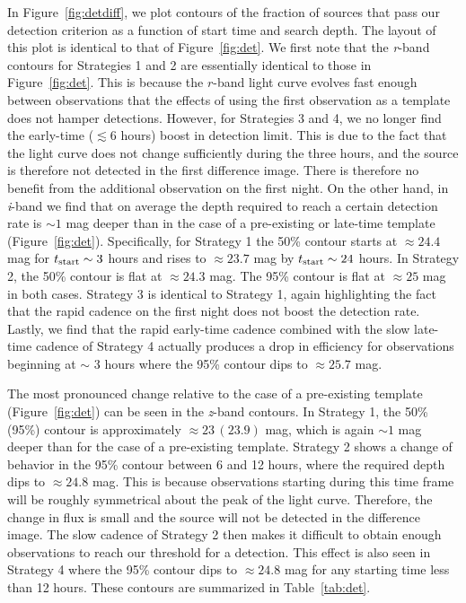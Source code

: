 In Figure~\ref{fig:detdiff}, we plot contours of the fraction of sources that pass our detection criterion as a function of start time and search depth. The layout of this plot is identical to that of Figure~\ref{fig:det}. We first note that the {\em r}-band contours for Strategies 1 and 2 are essentially identical to those in Figure~\ref{fig:det}. This is because the $r$-band light curve evolves fast enough between observations that the effects of using the first observation as a template does not hamper detections. However, for Strategies 3 and 4, we no longer find the early-time ($\lesssim6$ hours) boost in detection limit. This is due to the fact that the light curve does not change sufficiently during the three hours, and the source is therefore not detected in the first difference image. There is therefore no benefit from the additional observation on the first night. On the other hand, in {\em i}-band we find that on average the depth required to reach a certain detection rate is $\sim 1$ mag deeper than in the case of a pre-existing or late-time template (Figure~\ref{fig:det}). Specifically, for Strategy 1 the 50\% contour starts at $\approx24.4$ mag for $t_{{\rm start}} \sim 3$ hours and rises to $\approx 23.7$ mag by $t_{{\rm start}} \sim24$ hours. In Strategy 2, the 50\% contour is flat at $\approx24.3$ mag. The 95\% contour is flat at $\approx25$ mag in both cases. Strategy 3 is identical to Strategy 1, again highlighting the fact that the rapid cadence on the first night does not boost the detection rate. Lastly, we find that the rapid early-time cadence combined with the slow late-time cadence of Strategy 4 actually produces a drop in efficiency for observations beginning at $\sim$ 3 hours where the 95\% contour dips to $\approx 25.7$ mag.

The most pronounced change relative to the case of a pre-existing template (Figure~\ref{fig:det}) can be seen in the {\em z}-band contours. In Strategy 1, the 50\% (95\%) contour is approximately $\approx 23\,(23.9)$ mag, which is again $\sim 1$ mag deeper than for the case of a pre-existing template. Strategy 2 shows a change of behavior in the 95\% contour between 6 and 12 hours, where the required depth dips to $\approx 24.8$ mag. This is because observations starting during this time frame will be roughly symmetrical about the peak of the light curve. Therefore, the change in flux is small and the source will not be detected in the difference image. The slow cadence of Strategy 2 then makes it difficult to obtain enough observations to reach our threshold for a detection. This effect is also seen in Strategy 4 where the 95\% contour dips to $\approx 24.8$ mag for any starting time less than 12 hours. These contours are summarized in Table~\ref{tab:det}.

